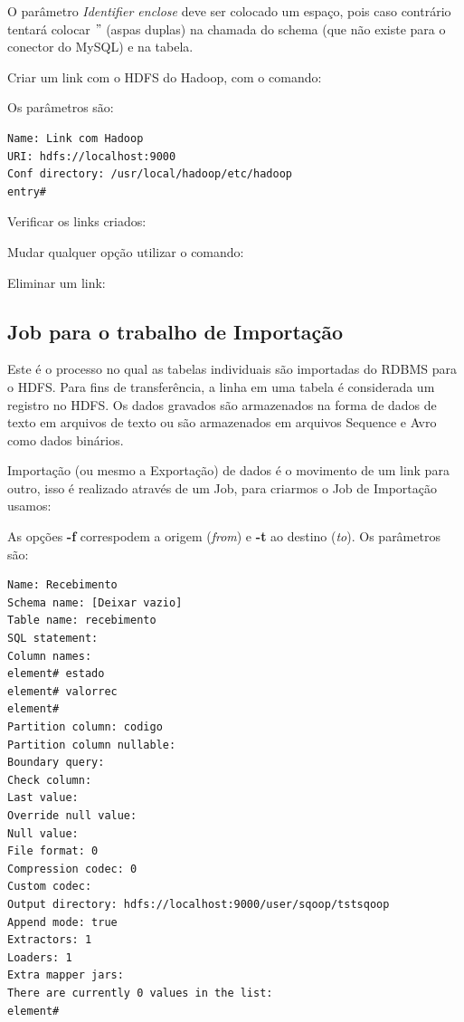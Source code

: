 \documentclass[a4paper,11pt]{article}
\begin{document}
O parâmetro \textit{Identifier enclose} deve ser colocado um espaço, pois caso contrário tentará colocar $"$ (aspas duplas) na chamada do schema (que não existe para o conector do MySQL) e na tabela.

Criar um link com o HDFS do Hadoop, com o comando: \\

Os parâmetros são:
\begin{lstlisting}[]
Name: Link com Hadoop
URI: hdfs://localhost:9000
Conf directory: /usr/local/hadoop/etc/hadoop
entry#
\end{lstlisting}

Verificar os links criados: \\

Mudar qualquer opção utilizar o comando: \\

Eliminar um link: \\

\subsection{Job para o trabalho de Importação}
Este é o processo no qual as tabelas individuais são importadas do RDBMS para o HDFS. Para fins de transferência, a linha em uma tabela é considerada um registro no HDFS. Os dados gravados são armazenados na forma de dados de texto em arquivos de texto ou são armazenados em arquivos Sequence e Avro como dados binários.

Importação (ou mesmo a Exportação) de dados é o movimento de um link para outro, isso é realizado através de um Job, para criarmos o Job de Importação usamos: \\

As opções \textbf{-f} correspodem a origem (\textit{from}) e \textbf{-t} ao destino (\textit{to}). Os parâmetros são:
\begin{lstlisting}[]
Name: Recebimento
Schema name: [Deixar vazio]
Table name: recebimento
SQL statement:
Column names:
element# estado
element# valorrec
element#
Partition column: codigo
Partition column nullable:
Boundary query:
Check column:
Last value:
Override null value:
Null value:
File format: 0
Compression codec: 0
Custom codec:
Output directory: hdfs://localhost:9000/user/sqoop/tstsqoop
Append mode: true
Extractors: 1
Loaders: 1
Extra mapper jars:
There are currently 0 values in the list:
element#
\end{lstlisting}
\end{document}
